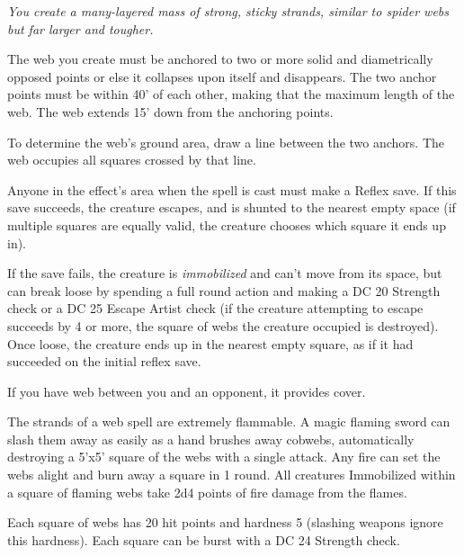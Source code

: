 \emph{You create a many-layered mass of strong, sticky strands, similar to spider webs but far larger and tougher.}

The web you create must be anchored to two or more solid and diametrically opposed points or else it collapses upon itself and disappears. 
The two anchor points must be within 40' of each other, making that the maximum length of the web. The web extends 15' down from the anchoring points. 

To determine the web's ground area, draw a line between the two anchors. The web occupies all squares crossed by that line.

Anyone in the effect's area when the spell is cast must make a Reflex save. 
If this save succeeds, the creature escapes, and is shunted to the nearest empty space 
(if multiple squares are equally valid, the creature chooses which square it ends up in). 

If the save fails, the creature is \emph{immobilized} and can't move from its space,  
but can break loose by spending a full round action and making a DC 20 Strength check or a DC 25 Escape Artist check 
(if the creature attempting to escape succeeds by 4 or more, the square of webs the creature occupied is destroyed).
Once loose, the creature ends up in the nearest empty square, as if it had succeeded on the initial reflex save.

If you have web between you and an opponent, it provides cover.

The strands of a web spell are extremely flammable. 
A magic flaming sword can slash them away as easily as a hand brushes away cobwebs, automatically destroying a 
5'x5' square of the webs with a single attack.
Any fire can set the webs alight and burn away a square in 1 round. 
All creatures Immobilized within a square of flaming webs take 2d4 points of fire damage from the flames.

Each square of webs has 20 hit points and hardness 5 (slashing weapons ignore this hardness).
Each square can be burst with a DC 24 Strength check.



